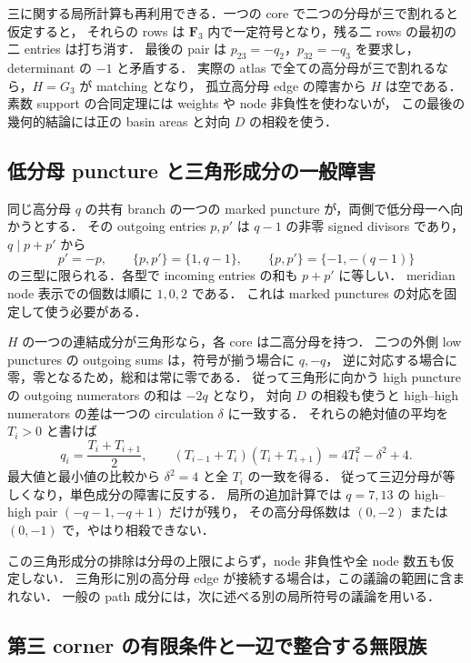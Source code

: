三に関する局所計算も再利用できる．一つの core で二つの分母が三で割れると仮定すると，
それらの rows は $\mathbf F_3$ 内で一定符号となり，残る二 rows の最初の二 entries は打ち消す．
最後の pair は $p_{23}=-q_2$，$p_{32}=-q_3$ を要求し，determinant の $-1$ と矛盾する．
実際の atlas で全ての高分母が三で割れるなら，$H=G_3$ が matching となり，
孤立高分母 edge の障害から $H$ は空である．
素数 support の合同定理には weights や node 非負性を使わないが，
この最後の幾何的結論には正の basin areas と対向 $D$ の相殺を使う．

\subsection{低分母 puncture と三角形成分の一般障害}

同じ高分母 $q$ の共有 branch の一つの marked puncture が，両側で低分母一へ向かうとする．
その outgoing entries $p,p'$ は $q-1$ の非零 signed divisors であり，
$q\mid p+p'$ から
\[
 p'=-p,\qquad\{p,p'\}=\{1,q-1\},\qquad
 \{p,p'\}=\{-1,-(q-1)\}
\]
の三型に限られる．各型で incoming entries の和も $p+p'$ に等しい．
meridian node 表示での個数は順に $1,0,2$ である．
これは marked punctures の対応を固定して使う必要がある．

$H$ の一つの連結成分が三角形なら，各 core は二高分母を持つ．
二つの外側 low punctures の outgoing sums は，符号が揃う場合に $q,-q$，
逆に対応する場合に零，零となるため，総和は常に零である．
従って三角形に向かう high puncture の outgoing numerators の和は $-2q$ となり，
対向 $D$ の相殺も使うと high--high numerators の差は一つの circulation $\delta$ に一致する．
それらの絶対値の平均を $T_i>0$ と書けば
\[
 q_i=\frac{T_i+T_{i+1}}2,\qquad
 (T_{i-1}+T_i)(T_i+T_{i+1})=4T_i^2-\delta^2+4.
\]
最大値と最小値の比較から $\delta^2=4$ と全 $T_i$ の一致を得る．
従って三辺分母が等しくなり，単色成分の障害に反する．
局所の追加計算では $q=7,13$ の high--high pair $(-q-1,-q+1)$ だけが残り，
その高分母係数は $(0,-2)$ または $(0,-1)$ で，やはり相殺できない．

この三角形成分の排除は分母の上限によらず，node 非負性や全 node 数五も仮定しない．
三角形に別の高分母 edge が接続する場合は，この議論の範囲に含まれない．
一般の path 成分には，次に述べる別の局所符号の議論を用いる．




\subsection{第三 corner の有限条件と一辺で整合する無限族}

